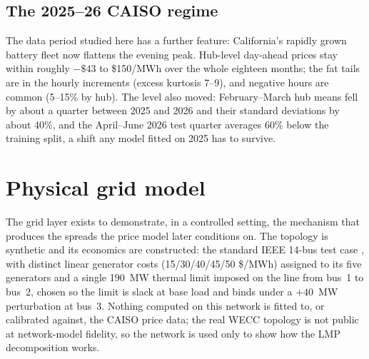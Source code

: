 \documentclass[11pt]{article}
\begin{document}
\subsection{The 2025--26 CAISO regime}
The data period studied here has a
further feature: California's rapidly grown battery fleet now flattens the
evening peak. Hub-level day-ahead prices stay within roughly $-\$43$ to
\$150/MWh over the whole eighteen months; the fat tails are in the hourly
increments (excess kurtosis 7--9), and
negative hours are common (5--15\% by hub). The level also moved: February--March
hub means fell by about a quarter between 2025 and 2026 and their standard
deviations by about 40\%, and the April--June 2026 test quarter averages
60\% below the training split, a shift any model fitted on 2025 has to
survive.

\section{Physical grid model}
\label{sec:grid}

The grid layer exists to demonstrate, in a controlled setting, the
mechanism that produces the spreads the price model later conditions on.
The topology is synthetic and its economics are constructed: the
standard IEEE 14-bus test case \cite{christie1993}, with distinct linear
generator costs (15/30/40/45/50 \$/MWh) assigned to its five generators
and a single 190~MW thermal limit imposed on the line from bus~1 to
bus~2, chosen so the limit is slack at base load and binds under a
$+40$~MW perturbation at bus~3. Nothing computed on this network is
fitted to, or calibrated against, the CAISO price data; the real WECC
topology is not public at network-model fidelity, so the network is used
only to show how the LMP decomposition works.
\end{document}
